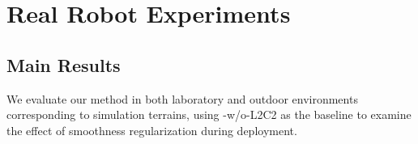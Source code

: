 



\section{Real Robot Experiments}\label{sec:real_robot_exp}

\subsection{Main Results}
We evaluate our method in both laboratory and outdoor environments corresponding to simulation terrains, using \ours-w/o-L2C2 as the baseline to examine the effect of smoothness regularization during deployment.

